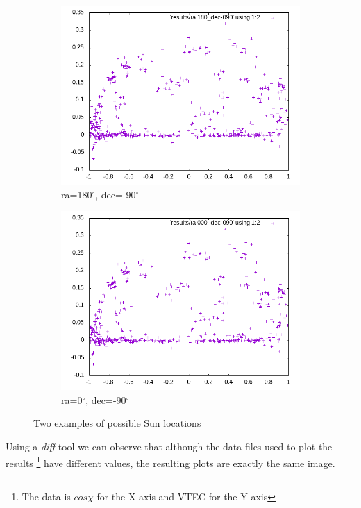\begin{figure}[!htb]
	\begin{subfigure}[b]{0.5\textwidth}
		\includegraphics[width=\linewidth]{images/ch4/ra180_dec-090.png}
		\caption{ra=180$^{\circ}$, dec=-90$^{\circ}$}
	\end{subfigure}
	\hfill
	\begin{subfigure}[b]{0.5\textwidth}
		\includegraphics[width=\linewidth]{images/ch4/ra000_dec-090.png}
		\caption{ra=0$^{\circ}$, dec=-90$^{\circ}$}
	\end{subfigure}
	\caption{Two examples of possible Sun locations}
	\label{fig:poles}
\end{figure}

Using a \textit{diff} tool we can observe that although the data files used to plot the results \footnote{The data is $cos\chi$ for the X axis and VTEC for the Y axis} have different values, the resulting plots are exactly the same image.

